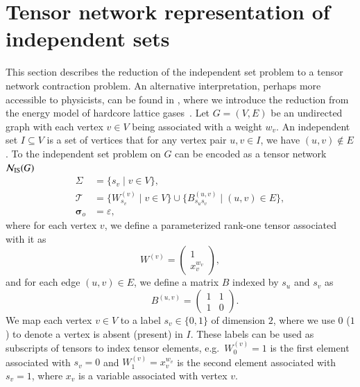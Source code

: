 \documentclass[review, onefignum, onetabnum]{siamart190516}
\begin{document}
\section{Tensor network representation of independent sets} \label{sec:tnmap}
This section describes the reduction of the independent set problem to a tensor network contraction problem.
An alternative interpretation, perhaps more accessible to physicists, can be found in , where we introduce the reduction from the energy model of hardcore lattice gases~\cite{Dyre2016, Fernandes2007}.
Let $G=(V,E)$ be an undirected graph with each vertex $v\in V$ being associated with a weight $w_v$.
An independent set $I \subseteq V$ is a set of vertices that for any vertex pair $u,v \in I$, we have $(u, v) \not\in E$.
To the independent set problem on $G$ can be encoded as a tensor network $\mathcal{N}_{\rm IS}(G)$
\begin{equation}\label{eq:mistensornetwork}
\begin{split}
    \Sigma &= \{s_v \mid v \in V\},\\
    \mathcal{T} &= \{W^{(v)}_{s_v} \mid v\in V\} \cup \{B^{(u, v)}_{s_us_v} \mid (u, v) \in E\},\\
    \boldsymbol{\sigma}_o &= \varepsilon,
    \end{split}
\end{equation}
where for each vertex $v$, we define a parameterized rank-one tensor associated with it as
\begin{equation}
    W^{(v)} = \left(\begin{matrix}
        1 \\
        x_v^{w_v}
    \end{matrix}\right),\label{eq:vertextensor}
\end{equation}
and for each edge $(u, v) \in E$, we define a matrix $B$ indexed by $s_u$ and $s_v$ as
\begin{equation}
    \qquad \quad 
       B^{(u, v)} = \left(\begin{matrix}
        1  & 1\\
        1 & 0
    \end{matrix}\right). \label{eq:edgetensor}
\end{equation}
We map each vertex $v\in V$ to a label $s_v \in \{0, 1\}$ of dimension $2$, where we use $0$ ($1$) to denote a vertex is absent (present) in $I$.
These labels can be used as subscripts of tensors to index tensor elements, e.g.\ $W^{(v)}_0=1$ is the first element associated with $s_v=0$ and $W^{(v)}_1=x_v^{w_v}$ is the second element associated with $s_v=1$, where $x_v$ is a variable associated with vertex $v$.
\end{document}
